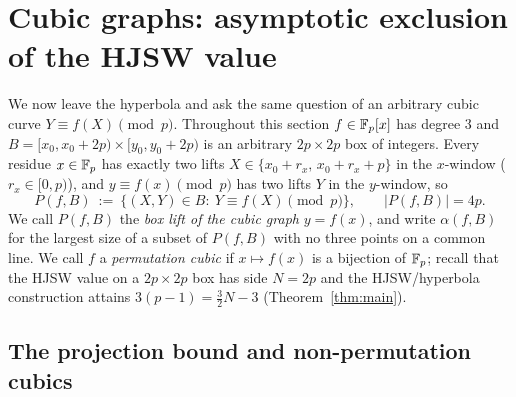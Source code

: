 %

\section{Cubic graphs: asymptotic exclusion of the HJSW value}\label{sec:cubic}

We now leave the hyperbola and ask the same question of an arbitrary cubic curve $Y\equiv f(X)\pmod p$. Throughout
this section $f\in\mathbb{F}_p[x]$ has degree $3$ and $B=[x_0,x_0+2p)\times[y_0,y_0+2p)$ is an arbitrary $2p\times2p$ box of
integers. Every residue $x\in\mathbb{F}_p$ has exactly two lifts $X\in\{x_0+r_x,\,x_0+r_x+p\}$ in the $x$-window
($r_x\in[0,p)$), and $y\equiv f(x)\pmod p$ has two lifts $Y$ in the $y$-window, so
\[
P(f,B)\ :=\ \{(X,Y)\in B:\ Y\equiv f(X)\pmod p\},\qquad |P(f,B)|=4p .
\]
We call $P(f,B)$ the \emph{box lift of the cubic graph} $y=f(x)$, and write $\alpha(f,B)$ for the largest size of a
subset of $P(f,B)$ with no three points on a common line. We call $f$ a
\emph{permutation cubic} if $x\mapsto f(x)$ is a bijection of $\mathbb{F}_p$; recall that the HJSW value on a $2p\times2p$
box has side $N=2p$ and the HJSW/hyperbola construction attains $3(p-1)=\tfrac32N-3$ (Theorem~\ref{thm:main}).

\subsection*{The projection bound and non-permutation cubics}

